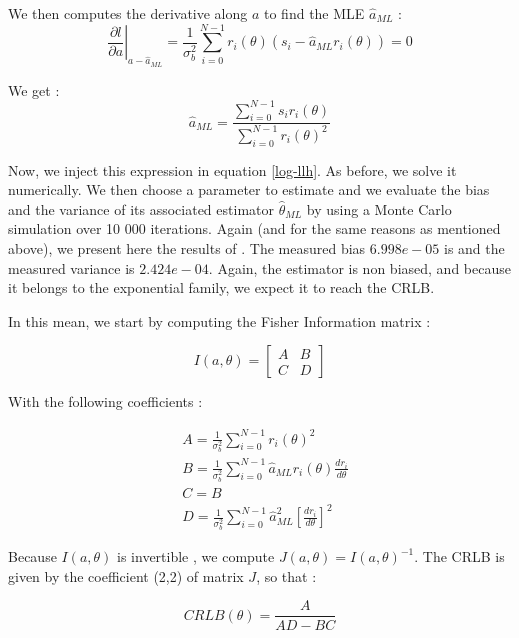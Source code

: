 \documentclass[10pt,letterpaper]{article}
\begin{document}
We then computes the derivative along $a$ to find the MLE $\hat{a}_{ML}$ :
\begin{equation}
     \left.\frac{\partial l}{\partial a}\right|_{a-\hat{a}_{M L}}=\frac{1}{\sigma_b^2} \sum_{i=0}^{N-1} r_i(\theta)\left(s_i-\hat{a}_{M L} r_i(\theta)\right)=0
\end{equation}

We get :
\begin{equation}
     \hat{a}_{M L}=\frac{\sum_{i=0}^{N-1} s_i r_i(\theta)}{\sum_{i=0}^{N-1} r_i(\theta)^2}
\end{equation}

Now, we inject this expression in equation \ref{log-llh}. As before, we solve it numerically. We then choose a parameter to estimate and we evaluate the bias and the variance of its associated estimator $\hat{\theta}_{ML}$ by using a Monte Carlo simulation over 10 000 iterations.
Again (and for the same reasons as mentioned above), we present here the results of \cite{project}. The measured bias $6.998e-05$ is and the measured variance is $2.424e-04$. Again, the estimator is non biased, and because it belongs to the exponential family, we expect it to reach the CRLB.

In this mean, we start by computing the Fisher Information matrix :

\begin{equation}
     I(a, \theta)=\left[\begin{array}{ll}
          A & B \\
          C & D
          \end{array}\right]
\end{equation}

With the following coefficients :

\begin{align}
     & A=\frac{1}{\sigma_b^2} \sum_{i=0}^{N-1} r_i(\theta)^2 \\
     & B=\frac{1}{\sigma_b^2} \sum_{i=0}^{N-1} \hat{a}_{M L} r_i(\theta) \frac{d r_i}{d \theta} \\
     & C=B \\
     & D=\frac{1}{\sigma_b^2} \sum_{i=0}^{N-1} \hat{a}_{M L}^2\left[\frac{d r_i}{d \theta}\right]^2
\end{align}

Because $I(a, \theta)$ is invertible \cite{goudail}, we compute $J(a, \theta) = I(a,\theta)^{-1}$. The CRLB is given by the coefficient (2,2) of matrix $J$, so that :

\begin{equation}
     CRLB(\theta) = \frac{A}{AD-BC}
\end{equation}
\end{document}

